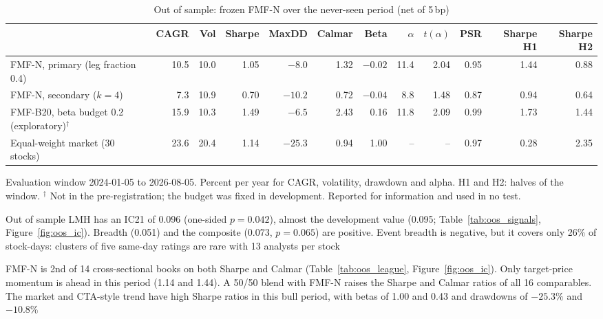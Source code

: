 \begin{table}[t]
\centering\footnotesize
\caption{Out of sample: frozen FMF-N over the never-seen period (net of 5\,bp)}\label{tab:oos}
\setlength{\tabcolsep}{4pt}
\begin{adjustbox}{max width=\textwidth}\begin{tabular}{lrrrrrrrrrrr}
\toprule
 & CAGR & Vol & Sharpe & MaxDD & Calmar & Beta & $\alpha$ & $t(\alpha)$ & PSR & Sharpe H1 & Sharpe H2\\
\midrule
FMF-N, primary (leg fraction 0.4) & 10.5 & 10.0 & 1.05 & $-8.0$ & 1.32 & $-0.02$ & 11.4 & 2.04 & 0.95 & 1.44 & 0.88\\
FMF-N, secondary ($k=4$) & 7.3 & 10.9 & 0.70 & $-10.2$ & 0.72 & $-0.04$ & 8.8 & 1.48 & 0.87 & 0.94 & 0.64\\
FMF-B20, beta budget 0.2 (exploratory)$^\dagger$ & 15.9 & 10.3 & 1.49 & $-6.5$ & 2.43 & 0.16 & 11.8 & 2.09 & 0.99 & 1.73 & 1.44\\
Equal-weight market (30 stocks) & 23.6 & 20.4 & 1.14 & $-25.3$ & 0.94 & 1.00 & -- & -- & 0.97 & 0.28 & 2.35\\
\bottomrule
\end{tabular}\end{adjustbox}
\par\smallskip\begin{minipage}{0.97\textwidth}\footnotesize Evaluation window 2024-01-05 to 2026-08-05. Percent per year for CAGR, volatility, drawdown and alpha. H1 and H2: halves of the window. $^\dagger$ Not in the pre-registration; the budget was fixed in development. Reported for information and used in no test.\end{minipage}
\end{table}

 Out of sample LMH has an IC21 of 0.096 (one-sided $p = 0.042$), almost the development value (0.095; Table~\ref{tab:oos_signals}, Figure~\ref{fig:oos_ic}). Breadth (0.051) and the composite (0.073, $p = 0.065$) are positive. Event breadth is negative, but it covers only 26\% of stock-days: clusters of five same-day ratings are rare with 13 analysts per stock

 FMF-N is 2nd of 14 cross-sectional books on both Sharpe and Calmar (Table~\ref{tab:oos_league}, Figure~\ref{fig:oos_ic}). Only target-price momentum is ahead in this period (1.14 and 1.44). A 50/50 blend with FMF-N raises the Sharpe and Calmar ratios of all 16 comparables. The market and CTA-style trend have high Sharpe ratios in this bull period, with betas of 1.00 and 0.43 and drawdowns of $-25.3\%$ and $-10.8\%$

